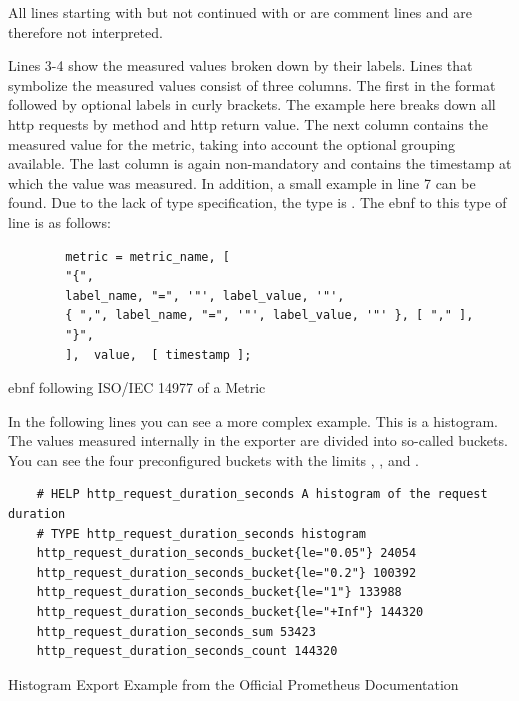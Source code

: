 All lines starting with \promcode{#} but not continued with  or  are comment lines and are therefore not interpreted.

Lines 3-4 show the measured values broken down by their labels. Lines that symbolize the measured values consist of three columns. The first in the format  followed by optional labels in curly brackets. The example here breaks down all \gls{http} requests by method and \gls{http} return value. The next column contains the measured value for the metric, taking into account the optional grouping available. The last column is again non-mandatory and contains the timestamp at which the value was measured. 
In addition, a small example in line 7 can be found. Due to the lack of type specification, the type is . The \gls{ebnf} to this type of line is as follows:
\begin{listing}[H]
	\begin{samepage}
		\begin{verbatim}
		metric = metric_name, [ 
		"{",
		label_name, "=", '"', label_value, '"',
		{ ",", label_name, "=", '"', label_value, '"' }, [ "," ], 
		"}",
		],  value,  [ timestamp ];
		\end{verbatim}
		\caption{\gls{ebnf} following ISO/IEC 14977 of a Metric}
	\end{samepage}
\end{listing}

In the following lines you can see a more complex example. This is a histogram. The values measured internally in the exporter are divided into so-called buckets. You can see the four preconfigured buckets with the limits , ,  and . 
\begin{listing}[H]
	\begin{verbatim}
	# HELP http_request_duration_seconds A histogram of the request duration
	# TYPE http_request_duration_seconds histogram
	http_request_duration_seconds_bucket{le="0.05"} 24054
	http_request_duration_seconds_bucket{le="0.2"} 100392
	http_request_duration_seconds_bucket{le="1"} 133988
	http_request_duration_seconds_bucket{le="+Inf"} 144320
	http_request_duration_seconds_sum 53423
	http_request_duration_seconds_count 144320
	\end{verbatim}
	\caption{Histogram Export Example from the Official Prometheus Documentation~\cite{PrometheusExpositionFormatBeispiel}}
\end{listing}

